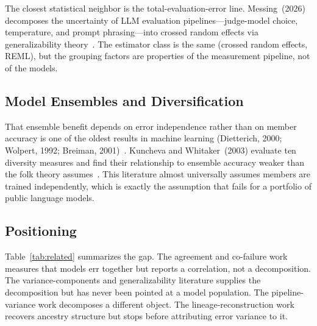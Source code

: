 \documentclass[journal]{IEEEtran}
\begin{document}
The closest statistical neighbor is the total-evaluation-error line. Messing~(2026) decomposes the uncertainty of LLM evaluation pipelines---judge-model choice, temperature, and prompt phrasing---into crossed random effects via generalizability theory~\cite{messing2026}. The estimator class is the same (crossed random effects, REML), but the grouping factors are properties of the measurement pipeline, not of the models.

\subsection{Model Ensembles and Diversification}

That ensemble benefit depends on error independence rather than on member accuracy is one of the oldest results in machine learning (Dietterich, 2000; Wolpert, 1992; Breiman, 2001)~\cite{dietterich2000,wolpert1992,breiman2001}. Kuncheva and Whitaker~(2003) evaluate ten diversity measures and find their relationship to ensemble accuracy weaker than the folk theory assumes~\cite{kuncheva2003}. This literature almost universally assumes members are trained independently, which is exactly the assumption that fails for a portfolio of public language models.

\subsection{Positioning}

Table~\ref{tab:related} summarizes the gap. The agreement and co-failure work measures that models err together but reports a correlation, not a decomposition. The variance-components and generalizability literature supplies the decomposition but has never been pointed at a model population. The pipeline-variance work decomposes a different object. The lineage-reconstruction work recovers ancestry structure but stops before attributing error variance to it.
\end{document}
